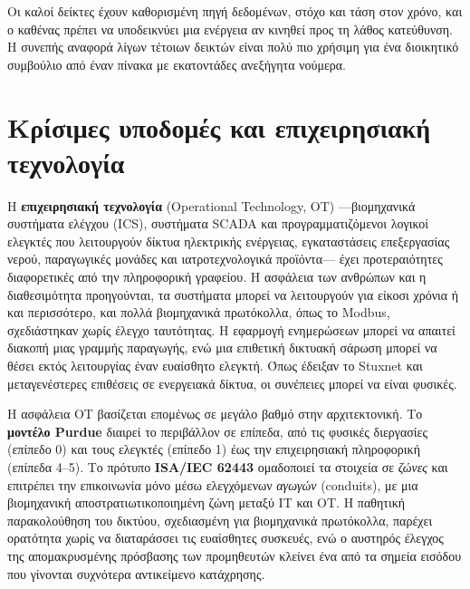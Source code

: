 \documentclass[11pt,openany]{book}
\begin{document}
Οι καλοί δείκτες έχουν καθορισμένη πηγή δεδομένων, στόχο και τάση στον χρόνο, και ο καθένας πρέπει να υποδεικνύει μια ενέργεια αν κινηθεί προς τη λάθος κατεύθυνση. Η συνεπής αναφορά λίγων τέτοιων δεικτών είναι πολύ πιο χρήσιμη για ένα διοικητικό συμβούλιο από έναν πίνακα με εκατοντάδες ανεξήγητα νούμερα.

\section{Κρίσιμες υποδομές και επιχειρησιακή τεχνολογία}\label{sec:13.6}
Η \textbf{επιχειρησιακή τεχνολογία} (Operational Technology, OT) —βιομηχανικά συστήματα ελέγχου (ICS), συστήματα SCADA και προγραμματιζόμενοι λογικοί ελεγκτές που λειτουργούν δίκτυα ηλεκτρικής ενέργειας, εγκαταστάσεις επεξεργασίας νερού, παραγωγικές μονάδες και ιατροτεχνολογικά προϊόντα— έχει προτεραιότητες διαφορετικές από την πληροφορική γραφείου. Η ασφάλεια των ανθρώπων και η διαθεσιμότητα προηγούνται, τα συστήματα μπορεί να λειτουργούν για είκοσι χρόνια ή και περισσότερο, και πολλά βιομηχανικά πρωτόκολλα, όπως το Modbus, σχεδιάστηκαν χωρίς έλεγχο ταυτότητας. Η εφαρμογή ενημερώσεων μπορεί να απαιτεί διακοπή μιας γραμμής παραγωγής, ενώ μια επιθετική δικτυακή σάρωση μπορεί να θέσει εκτός λειτουργίας έναν ευαίσθητο ελεγκτή. Όπως έδειξαν το Stuxnet και μεταγενέστερες επιθέσεις σε ενεργειακά δίκτυα, οι συνέπειες μπορεί να είναι φυσικές.

Η ασφάλεια OT βασίζεται επομένως σε μεγάλο βαθμό στην αρχιτεκτονική. Το \textbf{μοντέλο Purdue} διαιρεί το περιβάλλον σε επίπεδα, από τις φυσικές διεργασίες (επίπεδο 0) και τους ελεγκτές (επίπεδο 1) έως την επιχειρησιακή πληροφορική (επίπεδα 4–5). Το πρότυπο \textbf{ISA/IEC 62443} ομαδοποιεί τα στοιχεία σε \emph{ζώνες} και επιτρέπει την επικοινωνία μόνο μέσω ελεγχόμενων \emph{αγωγών} (conduits), με μια βιομηχανική αποστρατιωτικοποιημένη ζώνη μεταξύ IT και OT. Η παθητική παρακολούθηση του δικτύου, σχεδιασμένη για βιομηχανικά πρωτόκολλα, παρέχει ορατότητα χωρίς να διαταράσσει τις ευαίσθητες συσκευές, ενώ ο αυστηρός έλεγχος της απομακρυσμένης πρόσβασης των προμηθευτών κλείνει ένα από τα σημεία εισόδου που γίνονται συχνότερα αντικείμενο κατάχρησης.
\end{document}
